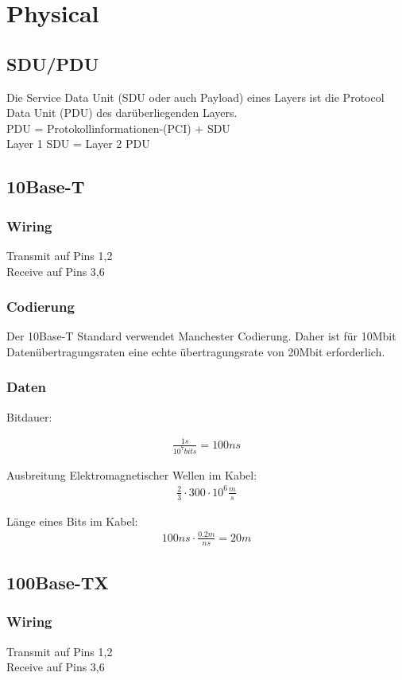 \section{Physical}
\subsection{SDU/PDU}
Die Service Data Unit (SDU oder auch Payload) eines Layers ist die Protocol Data Unit (PDU) des darüberliegenden Layers. \\
PDU = Protokollinformationen-(PCI) + SDU\\
Layer 1 SDU = Layer 2 PDU
\subsection{10Base-T}

\subsubsection{Wiring}
Transmit auf Pins 1,2\\
Receive auf Pins 3,6

\subsubsection{Codierung}
Der 10Base-T Standard verwendet Manchester Codierung. Daher ist für 10Mbit Datenübertragungsraten eine echte übertragungsrate von 20Mbit erforderlich.
\subsubsection{Daten}

Bitdauer:

\begin{align}
\frac{1s}{10^{7}bits} = 100ns
\end{align}


Ausbreitung Elektromagnetischer Wellen im Kabel: 
\begin{align}
\frac{2}{3} \cdot 300\cdot 10^{6} \frac{m}{s}
\end{align}

Länge eines Bits im Kabel:
\begin{align}
100ns \cdot \frac{0.2m}{ns} = 20m
\end{align}

\subsection{100Base-TX}
\subsubsection{Wiring}
Transmit auf Pins 1,2\\
Receive auf Pins 3,6

